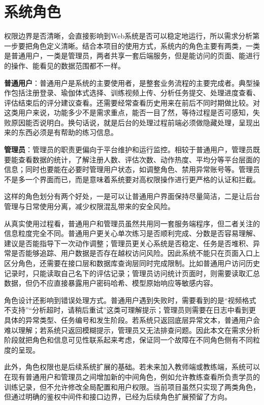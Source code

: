 \section{系统角色}
权限边界是否清晰，会直接影响到Web系统是否可以稳定地运行，所以需求分析第一步要把角色定义清晰。结合本项目的使用方式，系统内的角色主要有两类，一类是普通用户，一类是管理员，两者共享一套后端服务，但是能访问的页面、能进行的操作、能看见的数据范围都不一样。

\textbf{普通用户}：普通用户是系统的主要使用者，是整套业务流程的主要完成者。典型操作包括注册登录、瑜伽体式选择、训练视频上传、分析任务提交、处理进度查看、评估结束后的评分建议查看。还需要经常查看历史用来在前后不同时期做比较。对这类用户来说，功能多少不是需求重点，能否一目了然，等待过程是否可感知，失败原因能否说明白。换句话说，就是后台的处理过程前端必须做隐藏处理，呈现出来的东西必须是有帮助的练习信息。

\textbf{管理员}：管理员的职责更偏向于平台维护和运行监控。相较于普通用户，管理员既要能查看数据的统计，了解注册人数、评估次数、动作热度、平均分等平台层面的信息；同时也要能在必要时管理用户状态，如调整角色、禁用异常账号等。管理员不是多一个界面而已，而是意味着系统要对高权限操作进行更严格的认证和拦截。

这样的角色划分有两个好处，一是可以让普通用户界面保持尽量简洁，二是让后台管理与日常使用分离，减少权限混乱带来的安全风险。

从真实使用过程看，普通用户和管理员虽然共用同一套服务端程序，但二者关注的信息粒度完全不同。普通用户更关心单次练习是否顺利完成、分数是否容易理解、建议是否能指导下一次动作调整；管理员更关心系统是否稳定、任务是否堆积、异常是否能够追踪、用户数据是否存在越权访问风险。因此系统不能只在页面入口上区分角色，还需要在接口层和数据库查询层同时完成限制。比如普通用户访问历史记录时，只能读取自己名下的评估记录；管理员访问统计页面时，则需要读取汇总数据，但仍不应直接暴露用户密码哈希、模型原始响应等敏感内容。

角色设计还影响到错误处理方式。普通用户遇到失败时，需要看到的是“视频格式不支持”“分析超时，请稍后重试”这类可理解提示；管理员则需要在日志中看到更具体的异常类型、任务编号和发生阶段。若系统只返回底层异常文本，普通用户会难以理解；若系统只返回模糊提示，管理员又无法排查问题。因此本文在需求分析阶段就把角色和信息可见性联系起来考虑，保证同一个故障在不同角色侧有不同粒度的呈现。

此外，角色权限也是后续系统扩展的基础。若未来加入教师端或教练端，系统可以在现有普通用户和管理员之间增加新的中间角色，例如允许教练查看所负责学员的训练记录，但不允许修改全局配置和用户权限。当前项目虽然只实现了两类角色，但通过明确的鉴权中间件和接口边界，已经为后续角色扩展预留了方向。

